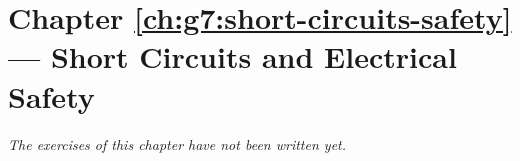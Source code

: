 \section*{Chapter \ref{ch:g7:short-circuits-safety} --- Short Circuits and Electrical Safety}


\emph{The exercises of this chapter have not been written yet.}
